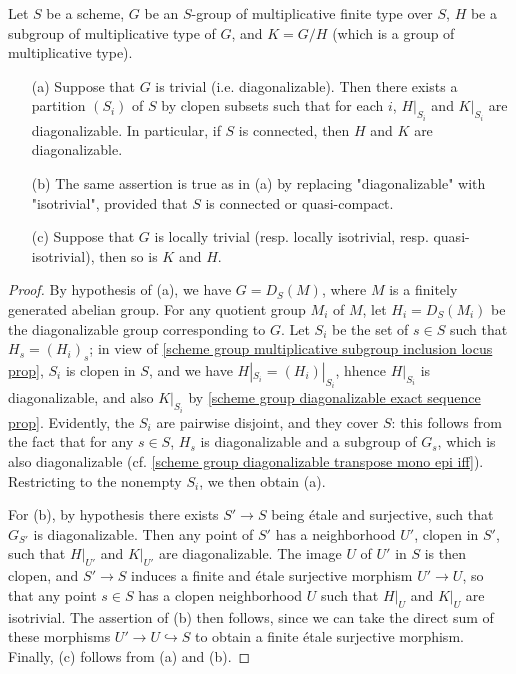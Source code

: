 \begin{proposition}\label{scheme group multiplicative Zariski trivial prop}
Let $S$ be a scheme, $G$ be an $S$-group of multiplicative finite type over $S$, $H$ be a subgroup of multiplicative type of $G$, and $K=G/H$ (which is a group of multiplicative type).
\begin{enumerate}
    \item[(a)] Suppose that $G$ is trivial (i.e. diagonalizable). Then there exists a partition $(S_i)$ of $S$ by clopen subsets such that for each $i$, $H|_{S_i}$ and $K|_{S_i}$ are diagonalizable. In particular, if $S$ is connected, then $H$ and $K$ are diagonalizable.
    \item[(b)] The same assertion is true as in (a) by replacing "diagonalizable" with "isotrivial", provided that $S$ is connected or quasi-compact.
    \item[(c)] Suppose that $G$ is locally trivial (resp. locally isotrivial, resp. quasi-isotrivial), then so is $K$ and $H$. 
\end{enumerate}
\end{proposition}
\begin{proof}
By hypothesis of (a), we have $G=D_S(M)$, where $M$ is a finitely generated abelian group. For any quotient group $M_i$ of $M$, let $H_i=D_S(M_i)$ be the diagonalizable group corresponding to $G$. Let $S_i$ be the set of $s\in S$ such that $H_s=(H_i)_s$; in view of \cref{scheme group multiplicative subgroup inclusion locus prop}, $S_i$ is clopen in $S$, and we have $H|_{S_i}=(H_i)|_{S_i}$, hhence $H|_{S_i}$ is diagonalizable, and also $K|_{S_i}$ by \cref{scheme group diagonalizable exact sequence prop}. Evidently, the $S_i$ are pairwise disjoint, and they cover $S$: this follows from the fact that for any $s\in S$, $H_s$ is diagonalizable and a subgroup of $G_s$, which is also diagonalizable (cf. \cref{scheme group diagonalizable transpose mono epi iff}). Restricting to the nonempty $S_i$, we then obtain (a).\par
For (b), by hypothesis there exists $S'\to S$ being \'etale and surjective, such that $G_{S'}$ is diagonalizable. Then any point of $S'$ has a neighborhood $U'$, clopen in $S'$, such that $H|_{U'}$ and $K|_{U'}$ are diagonalizable. The image $U$ of $U'$ in $S$ is then clopen, and $S'\to S$ induces a finite and \'etale surjective morphism $U'\to U$, so that any point $s\in S$ has a clopen neighborhood $U$ such that $H|_U$ and $K|_U$ are isotrivial. The assertion of (b) then follows, since we can take the direct sum of these morphisms $U'\to U\hookrightarrow S$ to obtain a finite \'etale surjective morphism. Finally, (c) follows from (a) and (b).
\end{proof}

